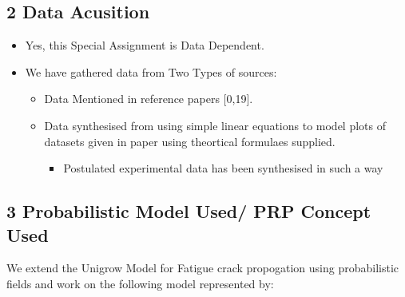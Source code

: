 \documentclass[11pt]{article}
\providecommand{\tightlist}{%
      \setlength{\itemsep}{0pt}\setlength{\parskip}{0pt}}
\begin{document}
\hypertarget{data-acusition}{%
\subsection{2 Data Acusition}\label{data-acusition}}

\begin{itemize}
\tightlist
\item
  Yes, this Special Assignment is Data Dependent.
\item
  We have gathered data from Two Types of sources:

  \begin{itemize}
  \tightlist
  \item
    Data Mentioned in reference papers {[}0,19{]}.
  \item
    Data synthesised from using simple linear equations to model plots
    of datasets given in paper using theortical formulaes supplied.

    \begin{itemize}
    \tightlist
    \item
      Postulated experimental data has been synthesised in such a way
    \end{itemize}
  \end{itemize}
\end{itemize}

\hypertarget{probabilistic-model-used-prp-concept-used}{%
\subsection{3 Probabilistic Model Used/ PRP Concept
Used}\label{probabilistic-model-used-prp-concept-used}}

We extend the Unigrow Model for Fatigue crack propogation using
probabilistic fields and work on the following model represented by:
\end{document}
